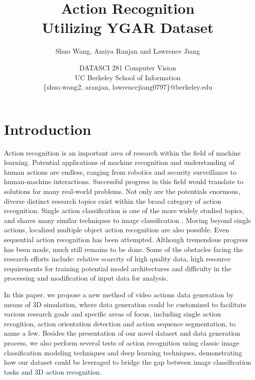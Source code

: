 \documentclass[
	a4paper, %
	10pt, %
	unnumberedsections, %
	twoside, %
]{t0004}
\title{Action Recognition\\ Utilizing YGAR Dataset} %
\author{
	Shuo Wang, Amiya Ranjan and Lawrence Jiang
}
\date{\footnotesize DATASCI 281 Computer Vision \\ UC Berkeley School of Information \\ \{shuo.wang2, aranjan, lawrencejiang0797\}@berkeley.edu}
\begin{document}
\maketitle %


\section{Introduction}

Action recognition is an important area of research within the field of machine learning. Potential applications of machine recognition and understanding of human actions are endless, ranging from robotics and security surveillance to human-machine interactions. Successful progress in this field would translate to solutions for many real-world problems. Not only are the potentials enormous, diverse distinct research topics exist within the broad category of action recognition. Single action classification\cite{Carreira:2018qr} is one of the more widely studied topics, and shares many similar techniques to image classification \cite{Ren:2015qr}. Moving beyond single actions, localized multiple object action recognition are also possible\cite{Wu:2023qr, Gu:2018qr}. Even sequential action recognition has been attempted\cite{Yeung:2017qr}. Although tremendous progress has been made, much still remains to be done. Some of the obstacles facing the research efforts include: relative scarcity of high quality data\cite{Carreira:2018qr}, high resource requirements for training potential model architectures and difficulty in the processing and modification of input data for analysis.

In this paper, we propose a new method of video actions data generation by means of 3D simulation, where data generation could be customized to facilitate various research goals and specific areas of focus, including single action recogition, action orientation detection and action sequence segmentation, to name a few. Besides the presentation of our novel dataset and data generation process, we also perform several tests of action recognition using classic image classification modeling techniques and deep learning techniques, demonstrating how our dataset could be leveraged to bridge the gap between image classification tasks and 3D action recognition.
\end{document}
